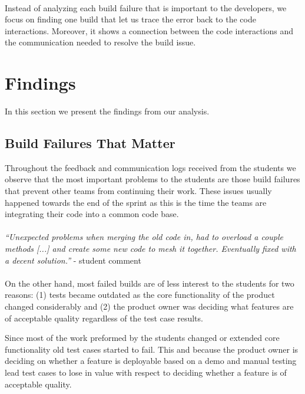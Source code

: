 \ \\
Instead of analyzing each build failure that is important to the developers, we focus on finding one build that let us trace the error back to the code interactions.
Moreover, it shows a connection between the code interactions and the communication needed to resolve the build issue.

\section{Findings}
\label{ch10:findings}
In this section we present the findings from our analysis.

\subsection{Build Failures That Matter}
Throughout the feedback and communication logs received from the students we observe that the most important problems to the students are those build failures that prevent other teams from continuing their work.
These issues usually happened towards the end of the sprint as this is the time the teams are integrating their code into a common code base.
\\ \ \\
\indent\emph{``Unexpected problems when merging the old code in, had to overload a couple methods [...]  and create some new code to mesh it together.  Eventually fixed with a decent solution.''} - student comment
\\ \ \\
\indent On the other hand, most failed builds are of less interest to the students for two reasons: 
(1) tests became outdated as the core functionality of the product changed considerably 
and (2) the product owner was deciding what features are of acceptable quality regardless of the test case results.

Since most of the work preformed by the students changed or extended core functionality old test cases started to fail.
This and because the product owner is deciding on whether a feature is deployable based on a demo and manual testing lead test cases to lose in value with respect to deciding whether a feature is of acceptable quality.

